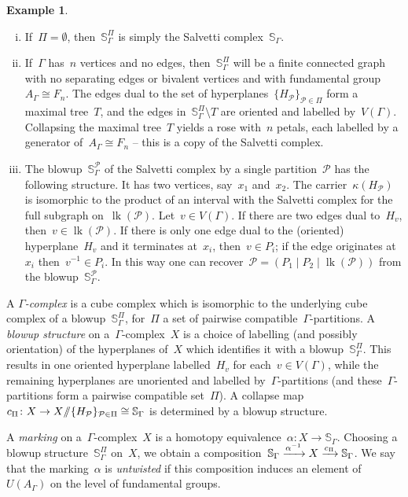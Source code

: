 \documentclass[11pt]{amsart}
\theoremstyle{definition}
\theoremstyle{definition}
\theoremstyle{definition}
\theoremstyle{definition}
\newtheorem{example}[theorem]{Example}
\newcommand{\calP}{\mathcal{P}} %
\newcommand{\raag}{A_\Gamma} %
\newcommand{\sal}{\mathbb{S}_{\Gamma}} %
\newcommand{\uag}{U(A_{\Gamma})} %
\newcommand{\link}[1]{\operatorname{lk}({#1})} %
\newcommand{\salb}[1]{\mathbb{S}_\Gamma^{#1}} %
\newcommand{\ssslash}{\smash{\sslash}} %
\begin{document}
\begin{example}
    \begin{enumerate}[(i)]
        \item If~$\Pi = \emptyset$, then~$\salb{\Pi}$ is simply the Salvetti complex~$\sal$.
        \item If~$\Gamma$ has~$n$ vertices and no edges, then~$\salb{\Pi}$ will be a finite connected graph with no separating edges or bivalent vertices and with fundamental group~$\raag \cong F_n$. The edges dual to the set of hyperplanes~$\{H_\calP\}_{\calP \in \Pi}$ form a maximal tree~$T$, and the edges in~$\salb{\Pi} \setminus T$ are oriented and labelled by~$V(\Gamma)$. Collapsing the maximal tree~$T$ yields a rose with~$n$ petals, each labelled by a generator of~$\raag \cong F_n$ -- this is a copy of the Salvetti complex.
        \item The blowup~$\salb{\calP}$ of the Salvetti complex by a single partition~$\calP$ has the following structure. It has two vertices, say~$x_1$ and~$x_2$. The carrier~$\kappa(H_\calP)$ is isomorphic to the product of an interval with the Salvetti complex for the full subgraph on~$\link{\calP}$. Let~$v \in V(\Gamma)$. If there are two edges dual to~$H_v$, then~$v \in \link{\calP}$. If there is only one edge dual to the (oriented) hyperplane~$H_v$ and it terminates at~$x_i$, then~$v \in P_i$; if the edge originates at~$x_i$ then~$v^{-1} \in P_i$. In this way one can recover~$\calP = \left(P_1 \;|\; P_2 \;|\; \link{\calP} \right)$ from the blowup~$\salb{\calP}$.
    \end{enumerate}
\end{example}

A \emph{$\Gamma$-complex} is a cube complex which is isomorphic to the underlying cube complex of a blowup~$\salb{\Pi}$, for~$\Pi$ a set of pairwise compatible~$\Gamma$-partitions. A \emph{blowup structure} on a~$\Gamma$-complex~$X$ is a choice of labelling (and possibly orientation) of the hyperplanes of~$X$ which identifies it with a blowup~$\salb{\Pi}$. This results in one oriented hyperplane labelled~$H_v$ for each~$v \in V(\Gamma)$, while the remaining hyperplanes are unoriented and labelled by~$\Gamma$-partitions (and these~$\Gamma$-partitions form a pairwise compatible set~$\Pi$). A collapse map~$c_\Pi\colon X \to X \ssslash \{H_\calP\}_{\calP \in \Pi} \cong \sal$ is determined by a blowup structure.

A \emph{marking} on a~$\Gamma$-complex~$X$ is a homotopy equivalence~$\alpha\colon X \to \sal$. Choosing a blowup structure~$\salb{\Pi}$ on~$X$, we obtain a composition~$\sal \xrightarrow{\smash{\alpha^{-1}}} X \xrightarrow{c_\Pi} \sal$. We say that the marking~$\alpha$ is \emph{untwisted} if this composition induces an element of~$\uag$ on the level of fundamental groups.
\end{document}
